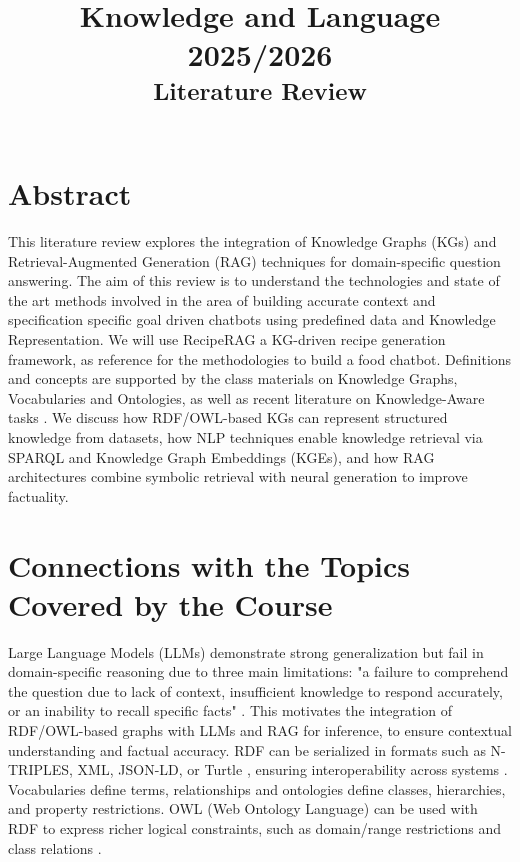 \documentclass[conference]{IEEEtran}
\begin{document}
\title{Knowledge and Language 2025/2026 \\
{ \textsuperscript{{Literature Review}}}
}

\author{
\and
{}
}

\maketitle

\section{Abstract}
\noindent
This literature review explores the integration of Knowledge Graphs (KGs) and Retrieval-Augmented Generation (RAG) techniques for domain-specific question answering. The aim of this review is to understand the technologies and state of the art methods involved in the area of building accurate context and specification specific goal driven chatbots using predefined data and Knowledge Representation. We will use RecipeRAG \cite{loesch2025reciperag} a KG-driven recipe generation framework, as reference for the methodologies to build a food chatbot. Definitions and concepts are supported by the class materials on Knowledge Graphs, Vocabularies and Ontologies, as well as recent literature on Knowledge-Aware tasks \cite{agrawal2024kg_hallucinations}. We discuss how RDF/OWL-based KGs can represent structured knowledge from datasets, how NLP techniques enable knowledge retrieval via SPARQL and Knowledge Graph Embeddings (KGEs), and how RAG architectures combine symbolic retrieval with neural generation to improve factuality.
\section{Connections with the Topics Covered by the Course}

\noindent
Large Language Models (LLMs) demonstrate strong generalization but fail in domain-specific reasoning due to three main limitations: "a failure to comprehend the question due to lack of context, insufficient knowledge to respond accurately, or an inability to recall specific facts" \cite{agrawal2024kg_hallucinations}. This motivates the integration of RDF/OWL-based graphs with LLMs and RAG for inference, to ensure contextual understanding and factual accuracy.
\noindent
RDF can be serialized in formats such as N-TRIPLES, XML, JSON-LD, or Turtle \cite{semanticweb2024slides}, ensuring interoperability across systems . Vocabularies define terms, relationships and ontologies define classes, hierarchies, and property restrictions.
OWL (Web Ontology Language) can be used with RDF to express richer logical constraints, such as domain/range restrictions and class relations \cite{semanticweb2024slides}.
\end{document}
